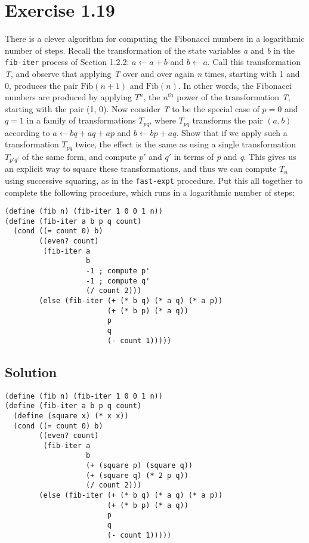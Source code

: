 \documentclass[11pt]{article}
\begin{document}
\section{Exercise 1.19}
\label{sec:org6c86c07}
There is a clever algorithm for computing the Fibonacci numbers in a
logarithmic number of steps. Recall the transformation of the state variables
\emph{a} and \emph{b} in the \texttt{fib-iter} process of Section 1.2.2: \(a \leftarrow a+b\)
and \(b \leftarrow a\). Call this transformation \emph{T}, and observe that applying
\emph{T} over and over again \emph{n} times, starting with 1 and 0, produces the pair \(\text{Fib}(n + 1)\) and \(\text{Fib}(n)\). In other words, the Fibonacci
numbers are produced by applying \(T^n\), the \(n^{\text{th}}\) power of
the transformation \emph{T}, starting with the pair (1, 0). Now consider \emph{T} to be
the special case of \(p = 0\) and \(q = 1\) in a family of transformations
\(T_{pq}\), where \(T_{pq}\) transforms the pair \((a,b)\) according to
\(a \leftarrow bq + aq + ap\) and \(b \leftarrow bp + aq\). Show that if we
apply such a transformation \(T_{pq}\) twice, the effect is the same as
using a single transformation \(T_{p'q'}\) of the same form, and compute \(p'\) and \(q'\) in terms of \emph{p} and \emph{q}. This gives us an explicit way to
square these transformations, and thus we can compute \(T_n\) using
successive squaring, as in the \texttt{fast-expt} procedure. Put this all together to
complete the following procedure, which runs in a logarithmic number of steps:
\begin{verbatim}
(define (fib n) (fib-iter 1 0 0 1 n))
(define (fib-iter a b p q count)
  (cond ((= count 0) b)
        ((even? count)
         (fib-iter a
                   b
                   -1 ; compute p'
                   -1 ; compute q'
                   (/ count 2)))
        (else (fib-iter (+ (* b q) (* a q) (* a p))
                        (+ (* b p) (* a q))
                        p
                        q
                        (- count 1)))))
\end{verbatim}
\subsection{Solution}
\label{sec:orgbe8842d}
\begin{verbatim}
(define (fib n) (fib-iter 1 0 0 1 n))
(define (fib-iter a b p q count)
  (define (square x) (* x x))
  (cond ((= count 0) b)
        ((even? count)
         (fib-iter a
                   b
                   (+ (square p) (square q))
                   (+ (square q) (* 2 p q))
                   (/ count 2)))
        (else (fib-iter (+ (* b q) (* a q) (* a p))
                        (+ (* b p) (* a q))
                        p
                        q
                        (- count 1)))))
\end{verbatim}
\end{document}
